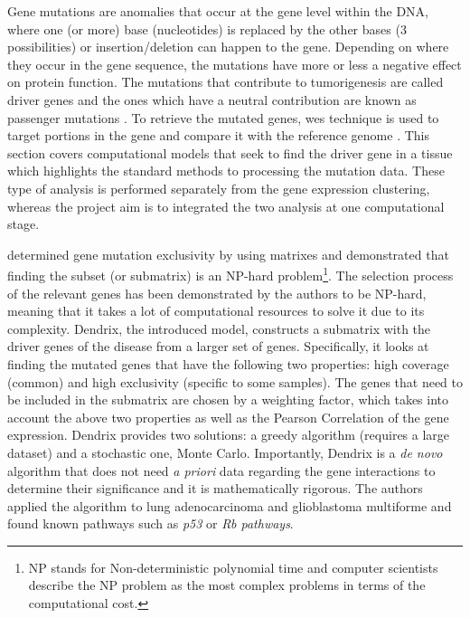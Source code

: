 Gene mutations are anomalies that occur at the gene level within the DNA, where one (or more) base (nucleotides) is replaced by the other bases (3 possibilities) or insertion/deletion can happen to the gene. Depending on where they occur in the gene sequence, the mutations have more or less a negative effect on protein function. The mutations that contribute to tumorigenesis are called driver genes and the ones which have a neutral contribution are known as passenger mutations \citep{Ciriello2012-hi}. To retrieve the mutated genes, \acrlong{wes} technique is used to target portions in the gene and compare it with the reference genome \citep{Schneider2016-ml}. This section covers computational models that seek to find the driver gene in a tissue which highlights the standard methods to processing the mutation data. These type of analysis is performed separately from the gene expression clustering, whereas the project aim is to integrated the two analysis at one computational stage.

\citet{Vandin2012-cf} determined gene mutation exclusivity by using matrixes and demonstrated that finding the subset (or submatrix) is an NP-hard problem\footnote{NP stands for Non-deterministic polynomial time and computer scientists describe the NP problem as the most complex problems in terms of the computational cost.}. The selection process of the relevant genes has been demonstrated by the authors to be NP-hard, meaning that it takes a lot of computational resources to solve it due to its complexity. Dendrix, the introduced model, constructs a submatrix with the driver genes of the disease from a larger set of genes. Specifically, it looks at finding the mutated genes that have the following two properties: high coverage (common) and high exclusivity (specific to some samples). The genes that need to be included in the submatrix are chosen by a weighting factor, which takes into account the above two properties as well as the Pearson Correlation of the gene expression. Dendrix provides two solutions: a greedy algorithm (requires a large dataset) and a stochastic one, Monte Carlo. Importantly, Dendrix is a \textit{de novo} algorithm that does not need \textit{a priori} data regarding the gene interactions to determine their significance and it is mathematically rigorous. The authors applied the algorithm to lung adenocarcinoma and glioblastoma multiforme and found known pathways such as \textit{p53} or \textit{Rb pathways}.


